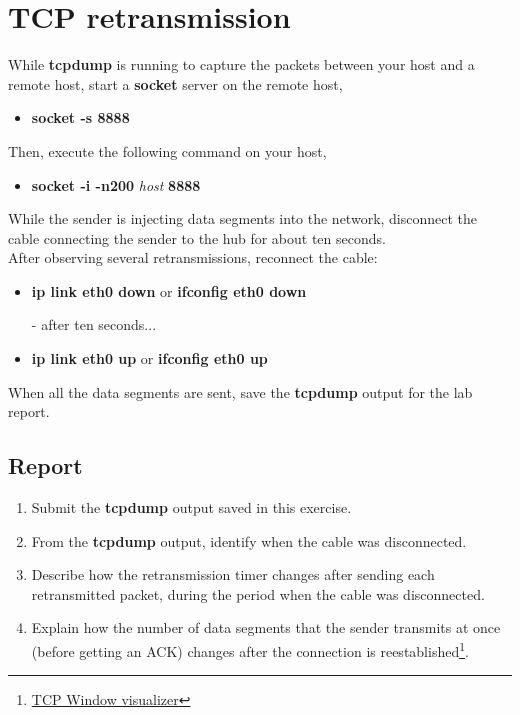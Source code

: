 \documentclass[10pt,a4paper]{article}
\numberwithin{equation}{section}
\numberwithin{figure}{section}
\numberwithin{table}{section}
\begin{document}
\section{TCP retransmission}
    While \textbf{tcpdump} is running to capture the packets between your host and a remote host, start a \textbf{socket} server on the remote host,
    \begin{itemize}
    	\item \textbf{socket -s 8888}
    \end{itemize}
    Then, execute the following command on your host,
    \begin{itemize}
        \item \textbf{socket -i -n200} \textit{host} \textbf{8888}
    \end{itemize}
    While the sender is injecting data segments into the network, disconnect the cable connecting the sender to the hub for about ten seconds. \\
    After observing several retransmissions, reconnect the cable:
    \begin{itemize}
    	\setlength{\itemindent}{30pt}
        \item \textbf{ip link eth0 down} or \textbf{ifconfig eth0 down}
        \item [-] after ten seconds...
        \item \textbf{ip link eth0 up} or \textbf{ifconfig eth0 up}
    \end{itemize}
    When all the data segments are sent, save the \textbf{tcpdump} output for the lab report.
    \subsection*{Report}
    \begin{enumerate}
        \item Submit the \textbf{tcpdump} output saved in this exercise.
        \item From the \textbf{tcpdump} output, identify when the cable was disconnected.
        \item Describe how the retransmission timer changes after sending each retransmitted packet, during the period when the cable was disconnected.
        \item Explain how the number of data segments that the sender transmits at once (before getting an ACK) changes after the connection is reestablished\footnote{\href{http://www.ccs-labs.org/teaching/rn/animations/gbn_sr/}{TCP Window visualizer}}.
    \end{enumerate}
    
\end{document}
